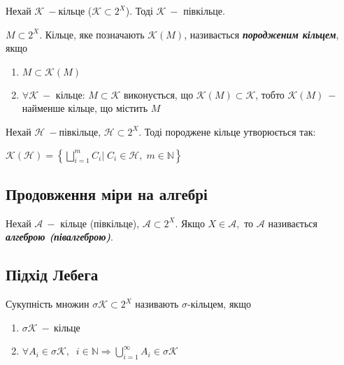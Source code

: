 \begin{theorem}
    Нехай $\mathcal{K} \:-$кільце ($\mathcal{K} \subset 2^X$). Тоді $\mathcal{K} \:-$ півкільце.
\end{theorem}

\begin{definition}
    $M \subset 2^X$. Кільце, яке позначають $\mathcal{K} (M)$, називається  \textcolor{NavyBlue}{\textbf{\textit{породженим кільцем}}}, якщо
    \begin{enumerate}
        \item $M \subset \mathcal{K}(M)$
        \item $\forall \mathcal{K}\:-$ кільце: $M \subset \mathcal{K}$ виконується, що $\mathcal{K}(M) \subset \mathcal{K}$, тобто $\mathcal{K}(M)\:-$найменше кільце, що містить $M$
    \end{enumerate}
\end{definition}


\begin{theorem}
    Нехай $\mathcal{H}\:-$півкільце, $\mathcal{H} \subset 2^X$. Тоді породжене кільце утворюється так: \centerline{$\mathcal{K}( \mathcal{H})= \left\{\displaystyle\bigsqcup\limits_{i = 1}^m C_i | \; C_i \in \mathcal{H}, \; m \in \mathbb{N}\right\}$}
\end{theorem}


\subsection{\large{Продовження міри на алгебрі}}
\begin{definition}
    Нехай $\mathcal{A}\:-$ кільце (півкільце), $\mathcal{A} \subset 2^X$. Якщо $X \in \mathcal{A},$  то $\mathcal{A}$ називається \newline \textcolor{NavyBlue}{\textbf{\textit{алгеброю (півалгеброю)}}}.
\end{definition}


\subsection{\large{Підхід Лебега}}


\begin{definition}
    Сукупність множин $\sigma \mathcal{K} \subset 2^X$ називають $\sigma$-кільцем, якщо
    \begin{enumerate}
        \item $\sigma \mathcal{K}\:-\:$кільце
        \item $\forall A_i \in \sigma \mathcal{K}, \;\; i \in \mathbb{N}
      	\Rightarrow  \displaystyle\bigcup\limits_{i = 1}^{\infty} A_i \in \sigma \mathcal{K}$
    \end{enumerate}
\end{definition}


